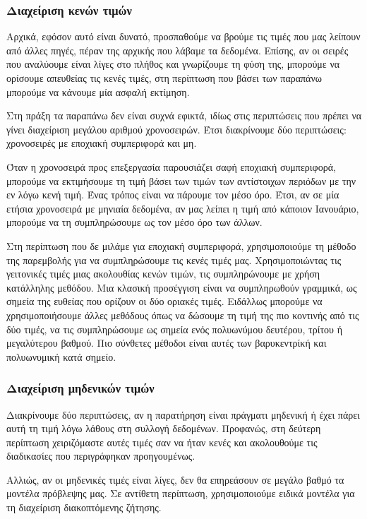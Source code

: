\subsubsection{Διαχείριση κενών τιμών}
Αρχικά, εφόσον αυτό είναι δυνατό, προσπαθούμε να βρούμε τις τιμές που μας λείπουν από άλλες πηγές, πέραν της αρχικής που λάβαμε τα δεδομένα. Επίσης, αν οι σειρές που αναλύουμε είναι λίγες στο πλήθος και γνωρίζουμε τη φύση της, μπορούμε να ορίσουμε απευθείας τις κενές τιμές, στη περίπτωση που βάσει των παραπάνω μπορούμε να κάνουμε μία ασφαλή εκτίμηση.

Στη πράξη τα παραπάνω δεν είναι συχνά εφικτά, ιδίως στις περιπτώσεις που πρέπει να γίνει διαχείριση μεγάλου αριθμού χρονοσειρών. Έτσι διακρίνουμε δύο περιπτώσεις: χρονοσειρές με εποχιακή συμπεριφορά και μη.

Όταν η χρονοσειρά προς επεξεργασία παρουσιάζει σαφή εποχιακή συμπεριφορά, μπορούμε να εκτιμήσουμε τη τιμή βάσει των τιμών των αντίστοιχων περιόδων με την εν λόγω κενή τιμή. Ένας τρόπος είναι να πάρουμε τον μέσο όρο. Έτσι, αν σε μία ετήσια χρονοσειρά με μηνιαία δεδομένα, αν μας λείπει η τιμή από κάποιον Ιανουάριο, μπορούμε να τη συμπληρώσουμε ως τον μέσο όρο των άλλων.

Στη περίπτωση που δε μιλάμε για εποχιακή συμπεριφορά, χρησιμοποιούμε τη μέθοδο της παρεμβολής για να συμπληρώσουμε τις κενές τιμές μας. Χρησιμοποιώντας τις γειτονικές τιμές μιας ακολουθίας κενών τιμών, τις συμπληρώνουμε με χρήση κατάλληλης μεθόδου. Μια κλασική προσέγγιση είναι να συμπληρωθούν γραμμικά, ως σημεία της ευθείας που ορίζουν οι δύο οριακές τιμές. Ειδάλλως μπορούμε να χρησιμοποιήσουμε άλλες μεθόδους όπως να δώσουμε τη τιμή της πιο κοντινής από τις δύο τιμές, να τις συμπληρώσουμε ως σημεία ενός πολυωνύμου δευτέρου, τρίτου ή μεγαλύτερου βαθμού. Πιο σύνθετες μέθοδοι είναι αυτές των  βαρυκεντρίκή και πολυωνυμική κατά σημείο.

\subsubsection{Διαχείριση μηδενικών τιμών}
Διακρίνουμε δύο περιπτώσεις, αν η παρατήρηση είναι πράγματι μηδενική ή έχει πάρει αυτή τη τιμή λόγω λάθους στη συλλογή δεδομένων. Προφανώς, στη δεύτερη περίπτωση χειριζόμαστε αυτές τιμές σαν να ήταν κενές και ακολουθούμε τις διαδικασίες που περιγράφηκαν προηγουμένως.

Αλλιώς, αν οι μηδενικές τιμές είναι λίγες, δεν θα επηρεάσουν σε μεγάλο βαθμό τα μοντέλα πρόβλεψης μας. Σε αντίθετη περίπτωση, χρησιμοποιούμε ειδικά μοντέλα για τη διαχείριση διακοπτόμενης ζήτησης.  

